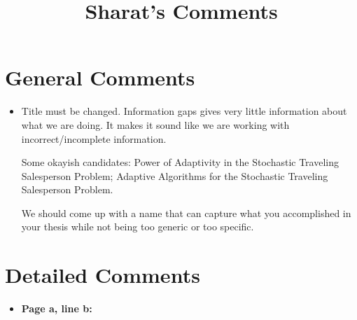 \documentclass[11pt]{article}
\title{Sharat's Comments}
\author{}
\date{}
\begin{document}
\maketitle

\section*{General Comments}

\begin{itemize}[leftmargin=*, itemsep=0.5em]
    \item Title must be changed. Information gaps gives very little information about what we are doing. It makes it sound like we are working with incorrect/incomplete information.   

    Some okayish candidates: Power of Adaptivity in the Stochastic Traveling Salesperson Problem; Adaptive Algorithms for the Stochastic Traveling Salesperson Problem. 

    We should come up with a name that can capture what you accomplished in your thesis while not being too generic or too specific.

\end{itemize}

\section*{Detailed Comments}

\begin{itemize}[leftmargin=*, itemsep=0.5em]
    \item \textbf{Page a, line b:}
    
\end{itemize}
\end{document}
